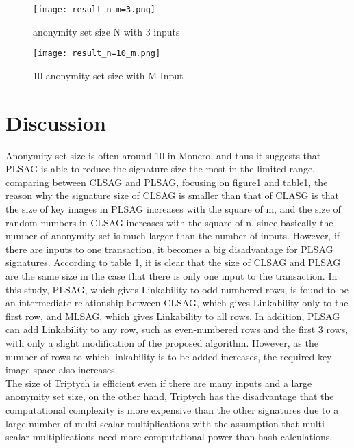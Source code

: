 \documentclass[letterpaper,10pt]{article}
\begin{document}
\begin{figure}[htbp]
    \begin{minipage}[b]{0.45\linewidth}
        \centering
        \texttt{[image: result\_n\_m=3.png]}
        \caption{anonymity set size N with 3 inputs}
      \end{minipage}
      \begin{minipage}[b]{0.45\linewidth}
        \centering
        \texttt{[image: result\_n=10\_m.png]}
        \caption{10 anonymity set size with M Input}
      \end{minipage}
\end{figure}

\section{Discussion}
Anonymity set size is often around 10 in Monero, and thus it suggests that PLSAG is able to reduce the signature size the most in the limited range.
comparing between CLSAG and PLSAG, focusing on figure1 and table1, the reason why the signature size of CLSAG is smaller than that of CLASG is that
the size of key images in PLSAG increases with the square of m, and the size of random numbers in CLSAG increases with the square of n, 
since basically the number of anonymity set is much larger than the number of inputs. 
However, if there are inputs to one transaction, it becomes a big disadvantage for PLSAG signatures.
According to table 1, it is clear that the size of CLSAG and PLSAG are the same size in the case that there is only one input to the transaction.
In this study, PLSAG, which gives Linkability to odd-numbered rows, is found to be an intermediate relationship between CLSAG,
which gives Linkability only to the first row, and MLSAG, which gives Linkability to all rows.
In addition, PLSAG can add Linkability to any row, such as even-numbered rows and the first 3 rows, with only a slight modification of the proposed algorithm.
However, as the number of rows to which linkability is to be added increases, the required key image space also increases.\\
\quad The size of Triptych is efficient even if there are many inputs and a large anonymity set size,
on the other hand, Triptych has the disadvantage that the computational complexity is more expensive than the other signatures due to a large number of multi-scalar multiplications
with the assumption that multi-scalar multiplications need more computational power than hash calculations.
\end{document}
